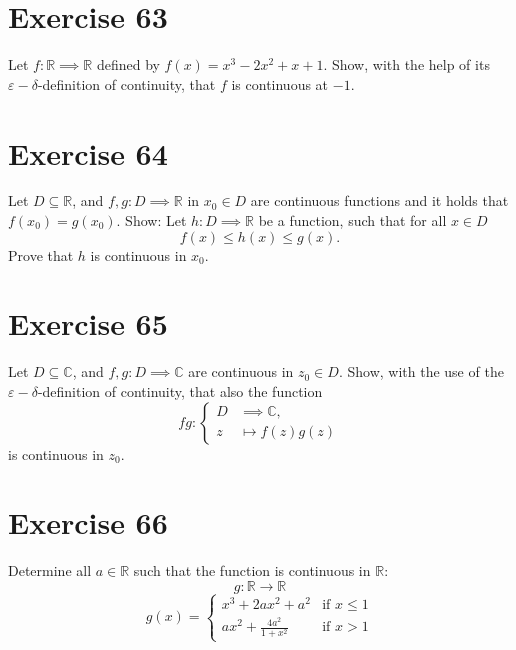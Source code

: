 \documentclass[a4paper]{article}
\theoremstyle{definition}
\begin{document}
\section{Exercise 63}
\begin{ex}
  Let $f: \mathbb R \implies \mathbb R$ defined by $f(x) = x^3 - 2x^2 + x + 1$.
  Show, with the help of its $\varepsilon-\delta$-definition of continuity,
  that $f$ is continuous at $-1$.
\end{ex}

\section{Exercise 64}
\begin{ex}
  Let $D \subseteq \mathbb R$, and $f, g: D \implies \mathbb R$ in $x_0 \in D$
  are continuous functions and it holds that $f(x_0) = g(x_0)$.
  Show: Let $h: D \implies \mathbb R$ be a function, such that for all $x \in D$
  \[ f(x) \leq h(x) \leq g(x). \]
  Prove that $h$ is continuous in $x_0$.
\end{ex}

\section{Exercise 65}
\begin{ex}
  Let $D \subseteq \mathbb C$, and $f, g: D \implies \mathbb C$ are continuous in $z_0 \in D$.
  Show, with the use of the $\varepsilon-\delta$-definition of continuity, that also the function
  \[
    fg : \begin{cases}
      D &\implies \mathbb C, \\
      z &\mapsto f(z) g(z)
    \end{cases}
  \]
  is continuous in $z_0$.
\end{ex}

\section{Exercise 66}
\begin{ex}
  Determine all $a \in \mathbb R$ such that the function is continuous in $\mathbb R$:
  \[ g: \mathbb R \to \mathbb R \]
  \[
    g(x) = \begin{cases}
      x^3 + 2ax^2 + a^2 & \text{if } x \leq 1 \\
      ax^2 + \frac{4a^2}{1 + x^2} & \text{if } x > 1
    \end{cases}
  \]
\end{ex}
\end{document}
